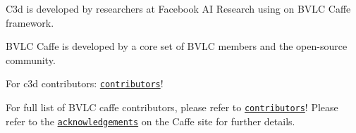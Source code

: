C3d is developed by researchers at Facebook A\-I Research using on B\-V\-L\-C Caffe framework.

B\-V\-L\-C Caffe is developed by a core set of B\-V\-L\-C members and the open-\/source community.

For c3d contributors\-: \href{https://github.com/dutran/c3d/graphs/contributors}{\tt contributors}!

For full list of B\-V\-L\-C caffe contributors, please refer to \href{https://github.com/BVLC/caffe/graphs/contributors}{\tt contributors}! Please refer to the \href{http://caffe.berkeleyvision.org/#acknowledgements}{\tt acknowledgements} on the Caffe site for further details. 